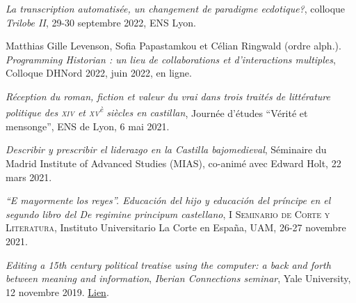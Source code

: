 \begin{rubric}{}
                    
                    \entry*
                
                        \textit{La transcription automatisée, un changement de paradigme
                            ecdotique?}, colloque \textit{Trilobe II}, 29-30 septembre 2022,
                        ENS Lyon.
                    
                    \entry*
                Matthias Gille Levenson, Sofia Papastamkou et Célian Ringwald (ordre
                        alph.). \textit{Programming Historian : un lieu de collaborations et
                            d’interactions multiples}, Colloque DHNord 2022, juin 2022, en
                        ligne.
                    
                    \entry*
                \textit{Réception du roman, fiction et valeur du vrai dans trois traités de
                            littérature politique des \textsc{xiv} et
                                \textsc{xv}\textsuperscript{è} siècles en castillan}, Journée
                        d'études \enquote{Vérité et mensonge}, ENS de Lyon, 6 mai 2021.
                    
                    \entry*
                \textit{Describir y prescribir el liderazgo en la Castilla
                            bajomedieval}, Séminaire du Madrid Institute of Advanced Studies
                        (MIAS), co-animé avec Edward Holt, 22 mars 2021.
                    
                    \entry*
                
                        \textit{``E mayormente los reyes''. Educación del hijo y educación del príncipe en
                            el segundo libro del \textit{De regimine principum} castellano},
                            \textsc{I Seminario de Corte y Literatura}, Instituto Universitario La Corte
                        en España, UAM, 26-27 novembre 2021.
                    
                    \entry*
                
                        \textit{\textit{Editing a 15th century political treatise using the computer: a back
                                and forth between meaning and information}}, \textit{Iberian
                            Connections seminar}, Yale University, 12 novembre 2019. \href{https://iberian-connections.yale.edu/articles/editing-a-xvth-century-political-treatise-using-the-computer/}{Lien}.
                    

\end{rubric}
